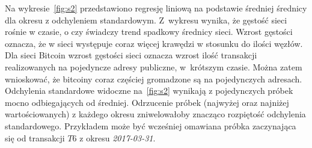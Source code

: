 \documentclass[12pt, twoside, final, openany]{mgr}
\begin{document}
\indent Na wykresie~\ref{fig:s2} przedstawiono regresję liniową na podstawie średniej średnicy dla okresu z odchyleniem standardowym. Z~wykresu wynika, że gęstość sieci rośnie w czasie, o czy świadczy trend spadkowy średnicy sieci. Wzrost gęstości oznacza, że w sieci występuje coraz więcej krawędzi w stosunku do ilości węzłów. Dla sieci Bitcoin wzrost gęstości sieci oznacza wzrost ilość transakcji realizowanych na pojedyncze adresy publiczne, w~krótszym czasie. Można zatem wnioskować, że bitcoiny coraz częściej gromadzone są na pojedynczych adresach. Odchylenia standardowe widoczne na~\ref{fig:s2} wynikają z pojedynczych próbek mocno odbiegających od średniej. Odrzucenie próbek (najwyżej oraz najniżej wartościowanych) z każdego okresu zniwelowałoby znacząco rozpiętość odchylenia standardowego. Przykładem może być wcześniej omawiana próbka zaczynająca się od transakcji $T6$ z okresu \textit{2017-03-31}. 
\end{document}
